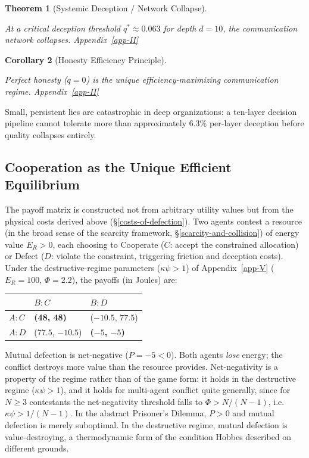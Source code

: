 \documentclass[11pt]{article}
\theoremstyle{plain}
\newtheorem{theorem}{Theorem}
\newtheorem{corollary}[theorem]{Corollary}
\theoremstyle{definition}
\theoremstyle{remark}
\newcounter{none}
\let\origsubsection\subsection
\renewcommand{\subsection}{\needspace{7\baselineskip}\origsubsection}
\begin{document}
\begin{theorem}[Systemic Deception / Network Collapse]
\label{ethics-thm-systemic-deception}

At a critical deception threshold $q^* \approx 0.063$ for depth $d = 10$, the communication network collapses. Appendix~\ref{app-II}
\end{theorem}

\begin{corollary}[Honesty Efficiency Principle]
\label{ethics-cor-honesty}

Perfect honesty ($q = 0$) is the unique efficiency-maximizing communication regime. Appendix~\ref{app-II}
\end{corollary}

Small, persistent lies are catastrophic in deep organizations: a
ten-layer decision pipeline cannot tolerate more than approximately
6.3\% per-layer deception before quality collapses entirely.

\subsection{Cooperation as the Unique Efficient
Equilibrium}\label{cooperation-as-the-unique-efficient-equilibrium}

The payoff matrix is constructed not from arbitrary utility values but
from the physical costs derived above (§\ref{costs-of-defection}). Two
agents contest a resource (in the broad sense of the scarcity framework,
§\ref{scarcity-and-collision}) of energy value \(E_R > 0\), each
choosing to Cooperate (\(C\): accept the constrained allocation) or
Defect (\(D\): violate the constraint, triggering friction and deception
costs). Under the destructive-regime parameters (\(\kappa\psi > 1\)) of
Appendix~\ref{app-V} (\(E_R = 100\), \(\Phi = 2.2\)), the payoffs (in
Joules) are:

{\def\LTcaptype{none} %
\begin{longtable}[]{@{}lll@{}}
\toprule\noalign{}
& \(B: C\) & \(B: D\) \\
\midrule\noalign{}
\endhead
\bottomrule\noalign{}
\endlastfoot
\(A: C\) & \textbf{(48, 48)} & (\(-10.5\), \(77.5\)) \\
\(A: D\) & (\(77.5\), \(-10.5\)) & \textbf{(\(-5\), \(-5\))} \\
\end{longtable}
}

Mutual defection is net-negative (\(P = -5 < 0\)). Both agents
\emph{lose} energy; the conflict destroys more value than the resource
provides. Net-negativity is a property of the regime rather than of the
game form: it holds in the destructive regime (\(\kappa\psi > 1\)), and
it holds for multi-agent conflict quite generally, since for
\(N \geq 3\) contestants the net-negativity threshold falls to
\(\Phi > N/(N-1)\), i.e.~\(\kappa\psi > 1/(N-1)\). In the abstract
Prisoner's Dilemma, \(P > 0\) and mutual defection is merely suboptimal.
In the destructive regime, mutual defection is value-destroying, a
thermodynamic form of the condition Hobbes \citep{Hobbes1651} described
on different grounds.
\end{document}
